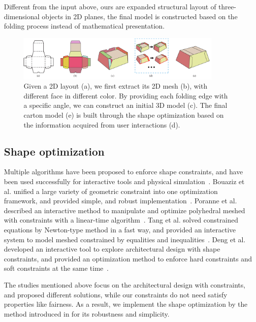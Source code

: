 Different from the input above, ours are expanded structural layout of three-dimensional objects in 2D planes, the final model is constructed based on the folding process instead of mathematical presentation.

\begin{figure}
	\centering
	\includegraphics[width=0.9\textwidth]{images/overview}
	\caption{Given a 2D layout (a), we first extract its 2D mesh (b), with different face in different color. By providing each folding edge with a specific angle, we can construct an initial 3D model (c). The final carton model (e) is built through the shape optimization based on the information acquired from user interactions (d).}
	\label{fig:overview}
\end{figure} 

\subsection{Shape optimization}
Multiple algorithms have been proposed to enforce shape constraints, and have been used successfully for interactive tools and physical simulation~\cite{Botsch:2006:PCP:1281957.1281959,Igarashi:2005:ASM:1186822.1073323}. 
Bouaziz et al. unified a large variety of geometric constraint into one optimization framework, and provided simple, and robust implementation~\cite{Bouaziz:2012:SSD:2346796.2346802}. 
Poranne et al. described an interactive method to manipulate and optimize polyhedral meshed with constraints with a linear-time algorithm~\cite{Poranne2013Interactive}. 
Tang et al. solved constrained equations by Newton-type method in a fast way, and provided an interactive system to model meshed constrained by equalities and inequalities~\cite{Tang:2014:FPM:2601097.2601213}. 
Deng et al. developed an interactive tool to explore architectural design with shape constraints, and provided an optimization method to enforce hard constraints and soft constraints at the same time~\cite{Deng2015}. 

The studies mentioned above focus on the architectural design with constraints, and proposed different solutions, while our constraints do not need satisfy properties like fairness. As a result, we implement the shape optimization by the method introduced in \cite{Bouaziz:2012:SSD:2346796.2346802} for its robustness and simplicity.



